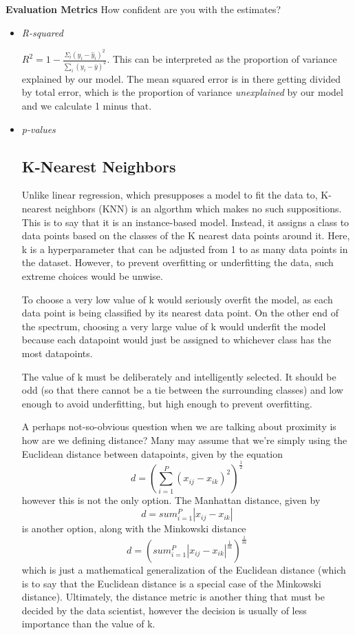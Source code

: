 \textbf{Evaluation Metrics} How confident are you with the estimates?
\begin{itemize}
    \item \textit{R-squared}

          \(R^{2}=1-\frac{\Sigma_{i}\left(y_{i}-\hat{y}_{i}\right)^{2}}{\sum_{i}\left(y_{i}-\bar{y}\right)^{2}}\). This can be interpreted as the proportion of variance explained by our model. The mean squared error is in there getting divided by total error, which is the proportion of variance \textit{unexplained} by our model and we calculate 1 minus that.

    \item \textit{p-values}
\subsection{K-Nearest Neighbors}
Unlike linear regression, which presupposes a model to fit the data to, K-nearest neighbors (KNN) is an algorthm which makes no such suppositions. This is to say that it is an instance-based model. 
Instead, it assigns a class to data points based on the classes of the K nearest data points around it. Here, k is a hyperparameter that can be adjusted from 1 to as many data points in the dataset. However, to prevent overfitting or underfitting the data, such extreme choices would be unwise.

To choose a very low value of k would seriously overfit the model, as each data point is being classified by its nearest data point. On the other end of the spectrum, choosing a very large value of k would underfit the model because each datapoint would just be assigned to whichever class has the most datapoints. 

The value of k must be deliberately and intelligently selected. It should be odd (so that there cannot be a tie between the surrounding classes) and low enough to avoid underfitting, but high enough to prevent overfitting.

A perhaps not-so-obvious question when we are talking about proximity is how are we defining distance? Many may assume that we're simply using the Euclidean distance between datapoints, given by the equation
\begin{equation}
d = (\sum_{i=1}^P{(x_{ij}-x_{ik})^2})^{\frac{1}{2}}
\end{equation}
however this is not the only option. The Manhattan distance, given by
\begin{equation}
d = sum_{i=1}^P{|x_{ij}-x_{ik}|}
\end{equation}
is another option, along with the Minkowski distance
\begin{equation}
d = (sum_{i=1}^P{|x_{ij}-x_{ik}|^\frac{1}{m}})^\frac{1}{m}
\end{equation}
which is just a mathematical generalization of the Euclidean distance (which is to say that the Euclidean distance is a special case of the Minkowski distance). Ultimately, the distance metric is another thing that must be decided by the data scientist, however the decision is usually of less importance than the value of k.
\end{itemize}


